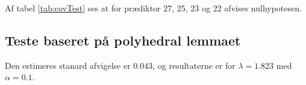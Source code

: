 Af tabel \ref{tab:covTest} ses at for prædiktor 27, 25, 23 og 22 afvises nulhypotesen.


\newpage
\subsection{Teste baseret på polyhedral lemmaet}








Den estimeres stanard afvigelse er \(0.043\), og resultaterne er for \(\lambda = 1.823\) med \(\alpha = 0.1\).